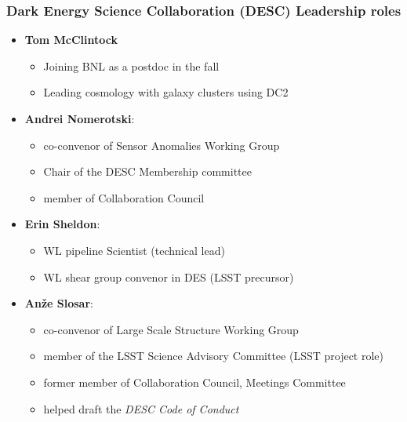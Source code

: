 \documentclass[aspectratio=169]{beamer}
\begin{document}
\begin{frame}
    \frametitle{Dark Energy Science Collaboration (DESC) Leadership roles}

    \begin{itemize}

        \item \textbf{Tom McClintock}
            \begin{itemize}
                \item Joining BNL as a postdoc in the fall
                \item Leading cosmology with galaxy
                    clusters using DC2
            \end{itemize}

        \item \textbf{Andrei Nomerotski}:
            \begin{itemize}
                \item co-convenor of Sensor Anomalies Working Group
                \item Chair of the DESC Membership committee
                \item member of Collaboration Council
            \end{itemize}


        \item \textbf{Erin Sheldon}:
            \begin{itemize}
                \item WL pipeline Scientist (technical lead)
                \item WL shear group convenor in DES (LSST precursor)
            \end{itemize}

        \item \textbf{An\v{z}e Slosar}: 
            \begin{itemize}
                \item co-convenor of Large Scale Structure Working Group
                \item member of the LSST Science Advisory Committee (LSST project role)
                \item former member of Collaboration Council, Meetings Committee
                \item helped draft the \emph {DESC Code of Conduct}

            \end{itemize}

    \end{itemize}

\end{frame}
\end{document}
